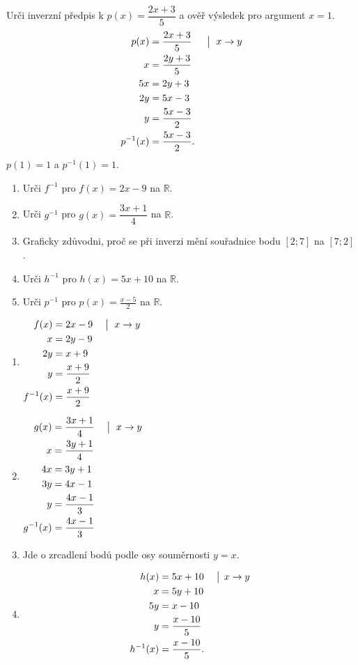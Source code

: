 \documentclass[11pt,a4paper]{article}
\begin{document}
\begin{zadaniReseniBox}[title={Rozšíření 1}]
Urči inverzní předpis k $p(x)=\dfrac{2x+3}{5}$ a ověř výsledek pro argument $x=1$.
\tcblower
\[
\begin{aligned}
p(x)&=\frac{2x+3}{5} &&\bigm|\ x\to y\\
x&=\frac{2y+3}{5}\\
5x&=2y+3\\
2y&=5x-3\\
y&=\frac{5x-3}{2}\\
p^{-1}(x)&=\frac{5x-3}{2}.
\end{aligned}
\]
$p(1)=1$ a $p^{-1}(1)=1$.
\end{zadaniReseniBox}

\begin{zadaniReseniBox}[title={Domácí úkol}]
\begin{enumerate}[label=\alph*)]
\item Urči $f^{-1}$ pro $f(x)=2x-9$ na $\mathbb R$.
\item Urči $g^{-1}$ pro $g(x)=\dfrac{3x+1}{4}$ na $\mathbb R$.
\item Graficky zdůvodni, proč se při inverzi mění souřadnice bodu $[2;7]$ na $[7;2]$.
\item Urči $h^{-1}$ pro $h(x)=5x+10$ na $\mathbb R$.
\item Urči $p^{-1}$ pro $p(x)=\frac{x-5}{2}$ na $\mathbb R$.
\end{enumerate}
\tcblower
\begin{enumerate}[label=\alph*)]
\item
\(\displaystyle\begin{aligned}f(x)&=2x-9 &&\bigm|\ x\to y\\x&=2y-9\\2y&=x+9\\y&=\frac{x+9}{2}\\f^{-1}(x)&=\frac{x+9}{2}\end{aligned}\)
\item
\(\displaystyle\begin{aligned}g(x)&=\frac{3x+1}{4} &&\bigm|\ x\to y\\x&=\frac{3y+1}{4}\\4x&=3y+1\\3y&=4x-1\\y&=\frac{4x-1}{3}\\g^{-1}(x)&=\frac{4x-1}{3}\end{aligned}\)
\item Jde o zrcadlení bodů podle osy souměrnosti $y=x$.
\item \[\begin{aligned}h(x)&=5x+10&&\bigm|\,x\to y\\x&=5y+10\\5y&=x-10\\y&=\frac{x-10}{5}\\h^{-1}(x)&=\frac{x-10}{5}.\end{aligned}\]

\end{enumerate}
\end{zadaniReseniBox}
\end{document}
